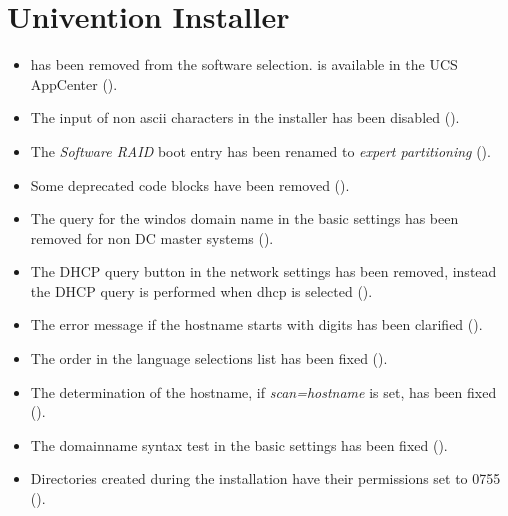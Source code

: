 \section{Univention Installer}
\begin{itemize}

\item {} has been removed from the software
selection.  is available in the UCS AppCenter
(). 

\item The input of non ascii characters in the installer has been disabled
().

\item The \emph{Software RAID} boot entry has been renamed to \emph{expert
partitioning} ().

\item Some deprecated code blocks have been removed ().

\item The query for the windos domain name in the basic settings has been
removed for non DC master systems ().

\item The DHCP query button in the network settings has been removed, instead
the DHCP query is performed when dhcp is selected ().

\item The error message if the hostname starts with digits has been clarified
().

\item The order in the language selections list has been fixed
().

\item The determination of the hostname, if
\emph{scan=hostname} is set, has been fixed
().

\item The domainname syntax test in the basic settings has been fixed
().

\item Directories created during the installation have their permissions set
to 0755 ().

\end{itemize}



